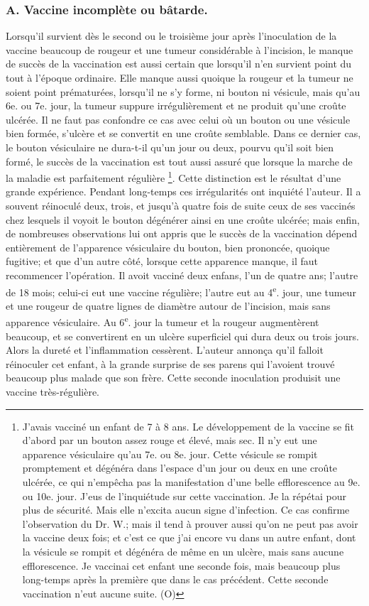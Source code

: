 \subsubsection{A. Vaccine incomplète ou bâtarde.}
Lorsqu'il survient dès le second ou le troisième jour après l'inoculation de la vaccine beaucoup de rougeur et une tumeur considérable à l'incision, le manque de succès de la vaccination est aussi certain que lorsqu'il n'en survient point du tout à l'époque ordinaire.
Elle manque aussi quoique la rougeur et la tumeur ne soient point prématurées, lorsqu'il ne s'y forme, ni bouton ni vésicule, mais qu'au 6e. ou 7e. jour, la tumeur suppure irrégulièrement et ne produit qu'une croûte ulcérée. Il ne faut pas confondre ce cas avec celui où un bouton ou une vésicule bien formée, s'ulcère et se convertit en une croûte semblable. Dans ce dernier cas, le bouton vésiculaire ne dura-t-il qu'un jour ou deux, pourvu qu'il soit bien formé, le succès de la vaccination est tout aussi assuré que lorsque la marche de la maladie est parfaitement régulière \footnote{J'avais vacciné un enfant de 7 à 8 ans. Le développement de la vaccine se fit d'abord par un bouton assez rouge et élevé, mais sec. Il n'y eut une apparence vésiculaire qu'au 7e. ou 8e. jour. Cette vésicule se rompit promptement et dégénéra dans l'espace d'un jour ou deux en une croûte ulcérée, ce qui n'empêcha pas la manifestation d'une belle efflorescence au 9e. ou 10e. jour. J'eus de l'inquiétude sur cette vaccination. Je la répétai pour plus de sécurité. Mais elle n'excita aucun signe d'infection. Ce cas confirme l'observation du Dr. W.; mais il tend à prouver aussi qu'on ne peut pas avoir la vaccine deux fois; et c'est ce que j'ai encore vu dans un autre enfant, dont la vésicule se rompit et dégénéra de même en un ulcère, mais sans aucune efflorescence. Je vaccinai cet enfant une seconde fois, mais beaucoup plus long-temps après la première que dans le cas précédent. Cette seconde vaccination n'eut aucune suite. (O)}.
\setcounter{page}{363}
Cette distinction est le résultat d'une grande expérience. Pendant long-temps ces irrégularités ont inquiété l'auteur. Il a souvent réinoculé deux, trois, et jusqu'à quatre fois de suite ceux de ses vaccinés chez lesquels il voyoit le bouton dégénérer ainsi en une croûte ulcérée; mais enfin, de nombreuses observations lui ont appris que le succès de la vaccination dépend entièrement de l'apparence vésiculaire du bouton, bien prononcée, quoique fugitive; et que d'un autre côté, lorsque cette apparence manque, il faut recommencer l'opération.
Il avoit vacciné deux enfans, l'un de quatre ans; l'autre de 18 mois; celui-ci eut une\setcounter{page}{364} vaccine régulière; l'autre eut au 4\textsuperscript{e}. jour, une tumeur et une rougeur de quatre lignes de diamètre autour de l'incision, mais sans apparence vésiculaire. Au 6\textsuperscript{e}. jour la tumeur et la rougeur augmentèrent beaucoup, et se convertirent en un ulcère superficiel qui dura deux ou trois jours. Alors la dureté et l'inflammation cessèrent. L'auteur annonça qu'il falloit réinoculer cet enfant, à la grande surprise de ses parens qui l'avoient trouvé beaucoup plus malade que son frère. Cette seconde inoculation produisit une vaccine très-régulière.
